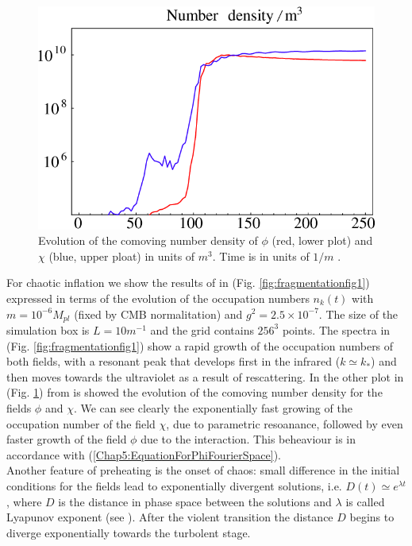 \documentclass[11pt,a4paper,twoside]{book}
\begin{document}
 \begin{figure}
 	\centering
 	\includegraphics[width=0.7\linewidth, height=0.3\textheight]{Images/Chap5/Fragmentation_Fig2}
 	\caption{Evolution of the comoving number density of $\phi$ (red, lower plot) and $\chi$ (blue, upper ploat) in units of $ m^{3} $. Time is in units of $ 1/m $ \cite{Chap5:Fragmentation}.}
 	\label{fig:fragmentationfig2}
 \end{figure}
For chaotic inflation we show the results of \cite{Chap5:Fragmentation} in (Fig. \ref{fig:fragmentationfig1}) expressed in terms of the evolution of the occupation numbers $ n_{k}(t) $ with $ m=10^{-6} M_{pl} $ (fixed by CMB normalitation) and $ g^{2}=2.5 \times 10^{-7} $. The size of the simulation box is $ L=10m^{-1} $ and the grid contains $ 256^{3} $ points. The spectra in (Fig. \ref{fig:fragmentationfig1})  show a rapid growth of the occupation numbers of both fields, with a resonant peak that develops first in the infrared ($ k\simeq k_{*} $) and then moves towards the ultraviolet as a result of rescattering. In the other plot in (Fig. \ref{fig:fragmentationfig2}) from \cite{Chap5:Fragmentation} is showed the evolution of the comoving number density for the fields $\phi$ and $\chi$. We can see clearly the exponentially fast growing of the occupation number of the field $\chi$, due to parametric resoanance, followed by even faster growth of the field $\phi$ due to the interaction. This beheaviour is in accordance with (\ref{Chap5:EquationForPhiFourierSpace}).\\
Another feature of preheating is the onset of chaos: small difference in the initial conditions for the fields lead to exponentially divergent solutions, i.e. $D(t) \simeq e^{\lambda t} $, where $ D $ is the distance in phase space between the solutions and $\lambda$ is called Lyapunov exponent (see \cite{Chap5:Fragmentation}). After the violent transition the distance $ D $ begins to diverge exponentially towards the turbolent stage.\\
\end{document}
